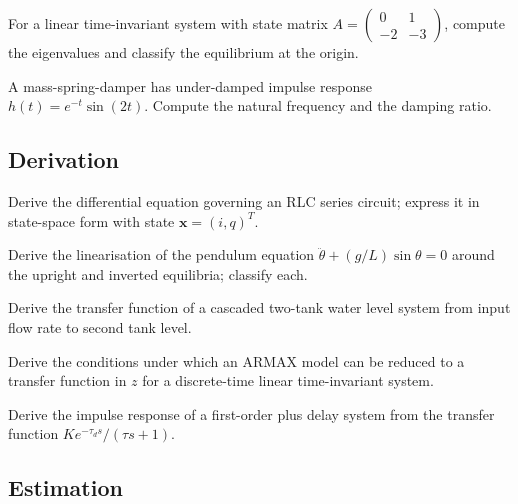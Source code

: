 \begin{exercise}
For a linear time-invariant system with state matrix $A = \begin{pmatrix} 0 & 1 \\ -2 & -3 \end{pmatrix}$, compute the eigenvalues and classify the equilibrium at the origin.
\end{exercise}

\begin{exercise}
A mass-spring-damper has under-damped impulse response $h(t) = e^{-t} \sin(2t)$. Compute the natural frequency and the damping ratio.
\end{exercise}

\subsection*{Derivation}

\begin{exercise}
Derive the differential equation governing an RLC series circuit; express it in state-space form with state $\mathbf{x} = (i, q)^T$.
\end{exercise}

\begin{exercise}
Derive the linearisation of the pendulum equation $\ddot{\theta} + (g/L)\sin\theta = 0$ around the upright and inverted equilibria; classify each.
\end{exercise}

\begin{exercise}
Derive the transfer function of a cascaded two-tank water level system from input flow rate to second tank level.
\end{exercise}

\begin{exercise}
Derive the conditions under which an ARMAX model can be reduced to a transfer function in $z$ for a discrete-time linear time-invariant system.
\end{exercise}

\begin{exercise}
Derive the impulse response of a first-order plus delay system from the transfer function $K e^{-\tau_d s}/(\tau s + 1)$.
\end{exercise}

\subsection*{Estimation}

